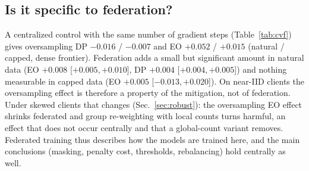 \subsection{Is it specific to federation?}
\label{sec:fedspec}
A centralized control with the same number of gradient steps (Table~\ref{tab:cvf}) gives oversampling DP $-0.016$ / $-0.007$ and EO $+0.052$ / $+0.015$ (natural / capped, dense frontier). Federation adds a small but significant amount in natural data (EO $+0.008$ [$+0.005,+0.010$], DP $+0.004$ [$+0.004,+0.005$]) and nothing measurable in capped data (EO $+0.005$ [$-0.013,+0.020$]). On near-IID clients the oversampling effect is therefore a property of the mitigation, not of federation. Under skewed clients that changes (Sec.~\ref{sec:robust}): the oversampling EO effect shrinks federated and group re-weighting with local counts turns harmful, an effect that does not occur centrally and that a global-count variant removes. Federated training thus describes how the models are trained here, and the main conclusions (masking, penalty cost, thresholds, rebalancing) hold centrally as well.

\begin{table}[t]
\centering
\caption{Frontier offsets at equal AUROC vs.\ the naive intersectional penalty (negative = better), logistic regression, rule~(q). Oversample: dense grid $\lambda\in\{0.5,1,2,4,8,16\}$ against the naive frontier built from all six points (the primary estimates); other rows use their own $\lambda$ points against the same frontier. Mean [95\% CI over 20 seeds per scenario].}
\label{tab:off}
\small
{}
\end{table}

\begin{table}[t]
\centering
\caption{Offsets at each $\lambda$ separately (rule (q)): naive frontier AUROC and EO at that $\lambda$, then offsets at the method's own AUROC (`--' if fewer than half of the seeds fall inside the naive AUROC range: capped $\lambda{=}0.5$, 3 of 20 seeds). Natural: naive frontier from the dense grid $\lambda\in\{0.5,1,2,4,8,16\}$, 20 seeds; capped: core grid. Mean [95\% CI].}
\label{tab:perlam}
\small
{}
\end{table}

